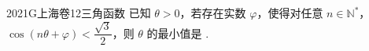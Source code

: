 
\begin{problem}{2021}{G}{上海卷}{12}{三角函数}
已知 $ \theta>0 $，若存在实数 $ \varphi $，使得对任意 $ n\in\mathbb{N}^* $，$ \cos(n\theta+\varphi)<\dfrac{\sqrt{3}}{2} $，则 $ \theta $ 的最小值是 \underline{\hspace{4em}}.
\end{problem}

\begin{answer}

\end{answer}

\begin{solutions}

\end{solutions}